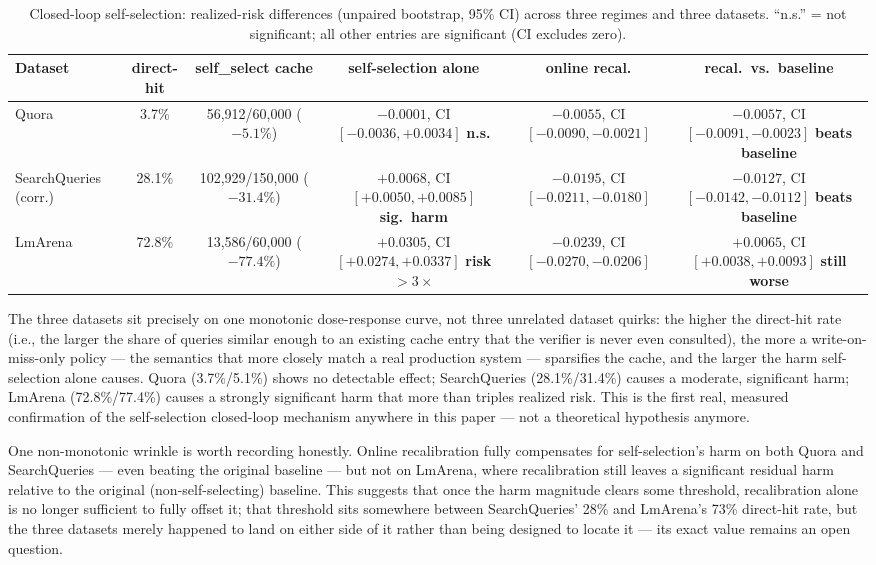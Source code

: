 \documentclass[11pt]{article}
\newenvironment{fittab}{\begin{lrbox}{\fittabbox}}{\end{lrbox}%
  \ifdim\wd\fittabbox>\linewidth\resizebox{\linewidth}{!}{\usebox{\fittabbox}}\else\usebox{\fittabbox}\fi}
\begin{document}
\begin{table}[h]
\centering
\small
\begin{fittab}\begin{tabular}{@{}lccccc@{}}
\toprule
\textbf{Dataset} & \textbf{direct-hit} & \textbf{self\_select cache} & \textbf{self-selection alone} & \textbf{online recal.} & \textbf{recal.\ vs.\ baseline} \\
\midrule
Quora & 3.7\% & 56{,}912/60{,}000 ($-5.1\%$) & $-0.0001$, CI $[-0.0036,+0.0034]$ \textbf{n.s.} & $-0.0055$, CI $[-0.0090,-0.0021]$ & $-0.0057$, CI $[-0.0091,-0.0023]$ \textbf{beats baseline} \\
SearchQueries (corr.) & 28.1\% & 102{,}929/150{,}000 ($-31.4\%$) & $+0.0068$, CI $[+0.0050,+0.0085]$ \textbf{sig.\ harm} & $-0.0195$, CI $[-0.0211,-0.0180]$ & $-0.0127$, CI $[-0.0142,-0.0112]$ \textbf{beats baseline} \\
LmArena & 72.8\% & 13{,}586/60{,}000 ($-77.4\%$) & $+0.0305$, CI $[+0.0274,+0.0337]$ \textbf{risk $>3\times$} & $-0.0239$, CI $[-0.0270,-0.0206]$ & $+0.0065$, CI $[+0.0038,+0.0093]$ \textbf{still worse} \\
\bottomrule
\end{tabular}\end{fittab}
\caption{Closed-loop self-selection: realized-risk differences (unpaired bootstrap, 95\% CI) across three regimes and three datasets. ``n.s.'' = not significant; all other entries are significant (CI excludes zero).}
\end{table}

The three datasets sit precisely on one monotonic dose-response curve, not three unrelated dataset quirks: the higher the direct-hit rate (i.e., the larger the share of queries similar enough to an existing cache entry that the verifier is never even consulted), the more a write-on-miss-only policy --- the semantics that more closely match a real production system --- sparsifies the cache, and the larger the harm self-selection alone causes. Quora (3.7\%/5.1\%) shows no detectable effect; SearchQueries (28.1\%/31.4\%) causes a moderate, significant harm; LmArena (72.8\%/77.4\%) causes a strongly significant harm that more than triples realized risk. This is the first real, measured confirmation of the self-selection closed-loop mechanism anywhere in this paper --- not a theoretical hypothesis anymore.

One non-monotonic wrinkle is worth recording honestly. Online recalibration fully compensates for self-selection's harm on both Quora and SearchQueries --- even beating the original baseline --- but not on LmArena, where recalibration still leaves a significant residual harm relative to the original (non-self-selecting) baseline. This suggests that once the harm magnitude clears some threshold, recalibration alone is no longer sufficient to fully offset it; that threshold sits somewhere between SearchQueries' 28\% and LmArena's 73\% direct-hit rate, but the three datasets merely happened to land on either side of it rather than being designed to locate it --- its exact value remains an open question.
\end{document}
